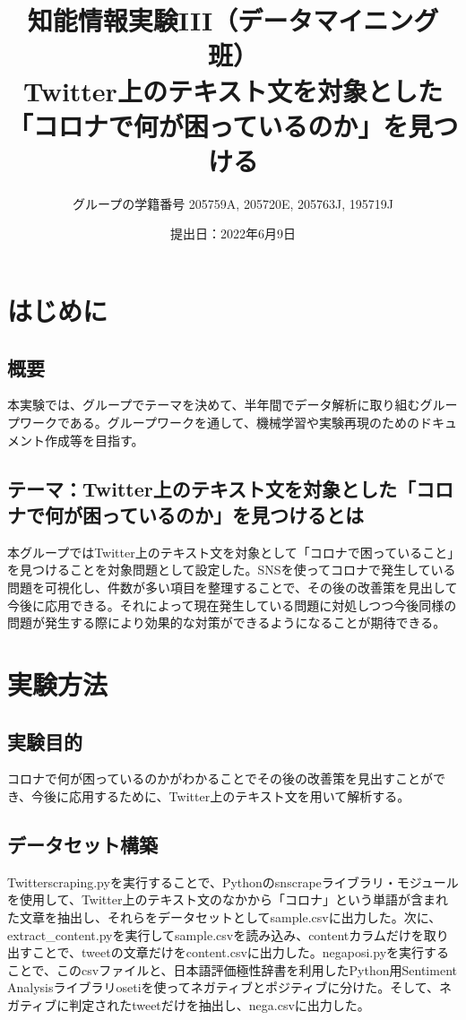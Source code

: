 \documentclass[a4paper, 11pt, titlepage]{jsarticle}
\title{知能情報実験III（データマイニング班）\\Twitter上のテキスト文を対象とした「コロナで何が困っているのか」を見つける}
\author{グループの学籍番号 205759A, 205720E, 205763J, 195719J}
\date{提出日：2022年6月9日}
\begin{document}
\maketitle
\tableofcontents
\clearpage

\section{はじめに}
\subsection{概要}
本実験では、グループでテーマを決めて、半年間でデータ解析に取り組むグループワークである。グループワークを通して、機械学習や実験再現のためのドキュメント作成等を目指す。

\subsection{テーマ：Twitter上のテキスト文を対象とした「コロナで何が困っているのか」を見つけるとは}
本グループではTwitter上のテキスト文を対象として「コロナで困っていること」を見つけることを対象問題として設定した。SNSを使ってコロナで発生している問題を可視化し、件数が多い項目を整理することで、その後の改善策を見出して今後に応用できる。それによって現在発生している問題に対処しつつ今後同様の問題が発生する際により効果的な対策ができるようになることが期待できる。

\section{実験方法}
\subsection{実験目的}
コロナで何が困っているのかがわかることでその後の改善策を見出すことができ、今後に応用するために、Twitter上のテキスト文を用いて解析する。



\subsection{データセット構築}
Twitterscraping.pyを実行することで、Pythonのsnscrapeライブラリ・モジュールを使用して、Twitter上のテキスト文のなかから「コロナ」という単語が含まれた文章を抽出し、それらをデータセットとしてsample.csvに出力した\cite{snscrape}。次に、extract\_content.pyを実行してsample.csvを読み込み、contentカラムだけを取り出すことで、tweetの文章だけをcontent.csvに出力した。negaposi.pyを実行することで、このcsvファイルと、日本語評価極性辞書を利用したPython用Sentiment Analysisライブラリosetiを使ってネガティブとポジティブに分けた\cite{oseti}。そして、ネガティブに判定されたtweetだけを抽出し、nega.csvに出力した。
\end{document}
